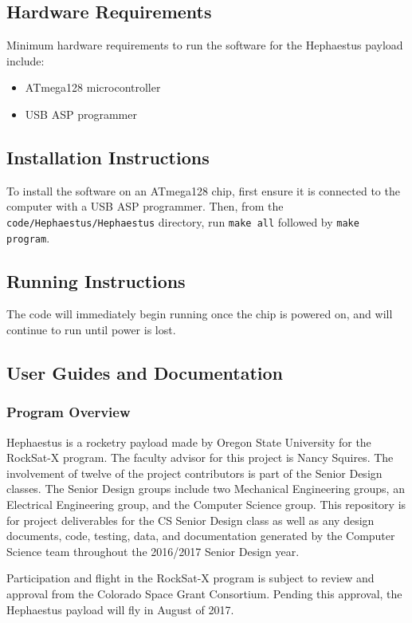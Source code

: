 \subsection{Hardware Requirements}
Minimum hardware requirements to run the software for the Hephaestus payload include:
\begin{itemize}
	\item{ATmega128 microcontroller}
	\item{USB ASP programmer}
\end{itemize}

\subsection{Installation Instructions}
To install the software on an ATmega128 chip, first ensure it is connected to
the computer with a USB ASP programmer. Then, from the 
\texttt{code/Hephaestus/Hephaestus} directory, run \texttt{make all}
followed by \texttt{make program}.

\subsection{Running Instructions}
The code will immediately begin running once the chip is powered on, and will
continue to run until power is lost.

\subsection{User Guides and Documentation}
\subsubsection{Program Overview}
Hephaestus is a rocketry payload made by Oregon State University for the RockSat-X program. The faculty advisor for this project is Nancy Squires. The involvement of twelve of the project contributors is part of the Senior Design classes. The Senior Design groups include two Mechanical Engineering groups, an Electrical Engineering group, and the Computer Science group. This repository is for project deliverables for the CS Senior Design class as well as any design documents, code, testing, data, and documentation generated by the Computer Science team throughout the 2016/2017 Senior Design year.

Participation and flight in the RockSat-X program is subject to review and approval from the Colorado Space Grant Consortium. Pending this approval, the Hephaestus payload will fly in August of 2017.

